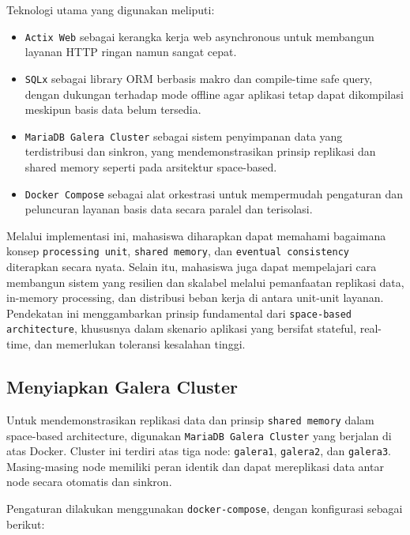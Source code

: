 Teknologi utama yang digunakan meliputi:
\begin{itemize}
	\item \texttt{Actix Web} sebagai kerangka kerja web asynchronous untuk membangun layanan HTTP ringan namun sangat cepat.
	\item \texttt{SQLx} sebagai library ORM berbasis makro dan compile-time safe query, dengan dukungan terhadap mode offline agar aplikasi tetap dapat dikompilasi meskipun basis data belum tersedia.
	\item \texttt{MariaDB Galera Cluster} sebagai sistem penyimpanan data yang terdistribusi dan sinkron, yang mendemonstrasikan prinsip replikasi dan shared memory seperti pada arsitektur space-based.
	\item \texttt{Docker Compose} sebagai alat orkestrasi untuk mempermudah pengaturan dan peluncuran layanan basis data secara paralel dan terisolasi.
\end{itemize}

Melalui implementasi ini, mahasiswa diharapkan dapat memahami bagaimana konsep \texttt{processing unit}, \texttt{shared memory}, dan \texttt{eventual consistency} diterapkan secara nyata. Selain itu, mahasiswa juga dapat mempelajari cara membangun sistem yang resilien dan skalabel melalui pemanfaatan replikasi data, in-memory processing, dan distribusi beban kerja di antara unit-unit layanan. Pendekatan ini menggambarkan prinsip fundamental dari \texttt{space-based architecture}, khususnya dalam skenario aplikasi yang bersifat stateful, real-time, dan memerlukan toleransi kesalahan tinggi.


\subsection{Menyiapkan Galera Cluster}

Untuk mendemonstrasikan replikasi data dan prinsip \texttt{shared memory} dalam space-based architecture, digunakan \texttt{MariaDB Galera Cluster} yang berjalan di atas Docker. Cluster ini terdiri atas tiga node: \texttt{galera1}, \texttt{galera2}, dan \texttt{galera3}. Masing-masing node memiliki peran identik dan dapat mereplikasi data antar node secara otomatis dan sinkron.

Pengaturan dilakukan menggunakan \texttt{docker-compose}, dengan konfigurasi sebagai berikut:

